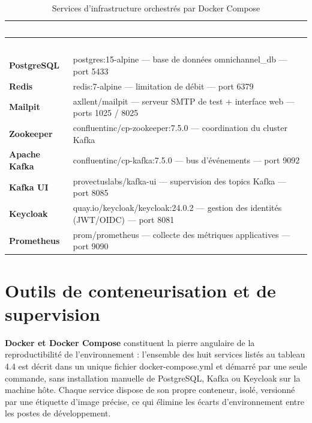 \documentclass[12pt,a4paper]{report}
\begin{document}
\begin{longtable}{@{}>{\raggedright\arraybackslash}p{}p{}@{}}
\caption{Services d'infrastructure orchestrés par Docker Compose}\\
\hline
\rowcolor{darkblue}\textcolor{white}{\textbf{Service}} & \textcolor{white}{\textbf{Image Docker -- rôle -- port exposé}} \\
\hline
\endfirsthead
\hline
\rowcolor{darkblue}\textcolor{white}{\textbf{Service}} & \textcolor{white}{\textbf{Image Docker -- rôle -- port exposé}} \\
\hline
\endhead
\hline
\endfoot
\textbf{PostgreSQL} & postgres:15-alpine --- base de données omnichannel\_db --- port 5433 \\
\hline
\textbf{Redis} & redis:7-alpine --- limitation de débit --- port 6379 \\
\hline
\textbf{Mailpit} & axllent/mailpit --- serveur SMTP de test + interface web --- ports 1025 / 8025 \\
\hline
\textbf{Zookeeper} & confluentinc/cp-zookeeper:7.5.0 --- coordination du cluster Kafka \\
\hline
\textbf{Apache Kafka} & confluentinc/cp-kafka:7.5.0 --- bus d'événements --- port 9092 \\
\hline
\textbf{Kafka UI} & provectuslabs/kafka-ui --- supervision des topics Kafka --- port 8085 \\
\hline
\textbf{Keycloak} & quay.io/keycloak/keycloak:24.0.2 --- gestion des identités (JWT/OIDC) --- port 8081 \\
\hline
\textbf{Prometheus} & prom/prometheus --- collecte des métriques applicatives --- port 9090 \\
\hline
\end{longtable}

\section{Outils de conteneurisation et de supervision}

\textbf{Docker et Docker Compose} constituent la pierre angulaire de la reproductibilité de l'environnement : l'ensemble des huit services listés au tableau 4.4 est décrit dans un unique fichier docker-compose.yml et démarré par une seule commande, sans installation manuelle de PostgreSQL, Kafka ou Keycloak sur la machine hôte. Chaque service dispose de son propre conteneur, isolé, versionné par une étiquette d'image précise, ce qui élimine les écarts d'environnement entre les postes de développement.
\end{document}
